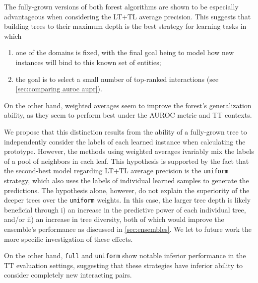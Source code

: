 The fully-grown versions of both forest algorithms are shown to be especially advantageous when considering the LT+TL average precision. This suggests that building trees to their maximum depth is the best strategy for learning tasks in which
%
\begin{enumerate}
    \item one of the domains is fixed, with the final goal being to model how new instances will bind to this known set of entities;
    \item the goal is to select a small number of top-ranked interactions (see \autoref{sec:comparing auroc aupr}).
\end{enumerate}
%
%
On the other hand, weighted averages seem to improve the forest's generalization ability, as they seem to perform best under the AUROC metric and TT contexts.

We propose that this distinction results from the ability of a fully-grown tree to independently consider the labels of each learned instance when calculating the prototype.
However, the methods using weighted averages ivariably mix the labels of a pool of neighbors in each leaf.
This hypothesis is supported by the fact that the second-best model regarding LT+TL average precision is the \texttt{uniform} strategy, which also uses the labels of individual learned samples to generate the predictions.
%
The hypothesis alone, however, do not explain the superiority of the deeper trees over the \texttt{uniform} weights. In this case, the larger tree depth is likely beneficial through i) an increase in the predictive power of each individual tree, and/or ii) an increase in tree diversity, both of which would improve the ensemble's performance as discussed in \autoref{sec:ensembles}. We let to future work the more specific investigation of these effects.

On the other hand, \texttt{full} and \texttt{uniform} show notable inferior performance in the TT evaluation settings, suggesting that these strategies have inferior ability to consider completely new interacting pairs.


